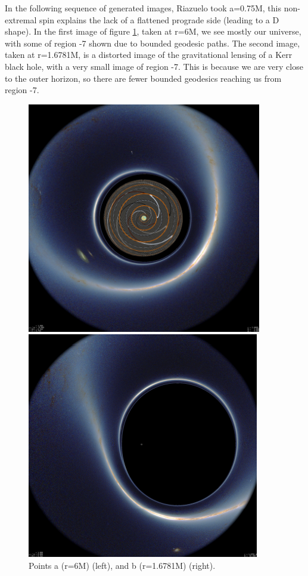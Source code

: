 \documentclass[oneside,openright,frontopenright, singlespacing]{dmathesis}
\begin{document}
\vspace{1em}
	In the following sequence of generated images, Riazuelo took a=0.75M, this non-extremal spin explains the lack of a flattened prograde side (leading to a D shape). In the first image of figure \ref{fig:Figure6.4}, taken at r=6M, we see mostly our universe, with some of region -7 shown due to bounded geodesic paths. The second image, taken at r=1.6781M, is a distorted image of the gravitational lensing of a Kerr black hole, with a very small image of region -7. This is because we are very close to the outer horizon, so there are fewer bounded geodesics reaching us from region -7. 

\vspace{1em}
\begin{figure}[!ht]
	\centering
	\begin{minipage}{0.5\textwidth}
		\centering
		\includegraphics[width=0.75\linewidth]{img/plunging1}
	\end{minipage}%
	\hfill
	\begin{minipage}{0.5\textwidth}
		\centering
		\includegraphics[width=0.75\linewidth]{img/plunging2}
	\end{minipage}
	\caption{Points a (r=6M) (left), and b (r=1.6781M) (right).}
	\label{fig:Figure6.4}
\end{figure}
\end{document}
